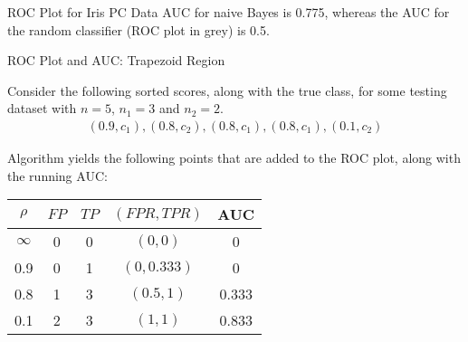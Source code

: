 \begin{frame}{ROC Plot for Iris PC Data}
AUC for naive Bayes is 0.775, whereas the AUC for the random classifier
(ROC plot in grey) is 0.5.\\
\begin{figure}[!t]\vspace*{-0.4pc}
\centering
{}
\end{figure}
\end{frame}


\begin{frame}{ROC Plot and AUC: Trapezoid Region}

  Consider the following sorted scores, along with the true class, for
  some testing
  dataset with $n = 5$, $n_1 = 3$ and $n_2 = 2$.
  \begin{align*}
    (0.9, c_1), (0.8, c_2), (0.8, c_1), (0.8, c_1), (0.1, c_2)
  \end{align*}

Algorithm yields the following points that
  are added to the ROC plot, along with the running AUC:

\begin{tabular}{|c|c|c|c|c|}
    \hline
  $\rho$ & $\mathit{FP}$ & $\mathit{TP}$ & $(\mathit{FPR}, \mathit{TPR})$ & AUC\\
  \hline
  $\infty$ & 0 & 0 & $(0,0)$ & 0\\[-2pt]
  0.9 & 0 & 1 & $(0, 0.333)$ & 0\\[-2pt]
  0.8 & 1 & 3 & $(0.5, 1)$ & 0.333\\[-2pt]
  0.1 & 2 & 3 & $(1, 1)$ & 0.833\\
  \hline
  \end{tabular}

\end{frame}


